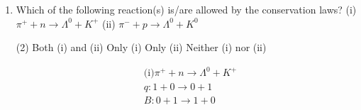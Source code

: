 \begin{enumerate}
	(iii) $p+n \rightarrow \pi^{+}+\pi^0+\pi^0$\\
	(iv) $p+\bar{v}_e \rightarrow n+e^{+}$\\
	Which of the following statements is true?
	{}
	\begin{tasks}(1)
		\task[\textbf{a.}] Process (i) obeys all conservation laws
		\task[\textbf{b.}]Process (ii) conserves baryon number, but violates energy-momentum conservation
		\task[\textbf{c.}] process (iii) is not allowed by strong interaction but is allowed by weak interactions
		\task[\textbf{d.}] Process (iv) conserves baryon number, but violates lepton number conservation
	\end{tasks}
	\begin{answer}
		\begin{align*}
		&\text { (i)}\quad  \bar{n} \rightarrow \bar{p}+e^{+}+\bar{v}_e\\
		&\begin{array}{lllll}
		q & 0 &-1&+1&
		0 \text{ (conserved)}\\
		\text { spin }&-\frac{1}{2}&-\frac{1}{2}&-\frac{1}{2}&-\frac{1}{2} \text { (not conserved) }\\
		\text { Le } &0 &0 &-1 & -1 \text { (not conserved) }
		\end{array}\\
		&\text{(ii) Baryon number is conserved but energy and momentum conservation violated.}\\
		&\text{(iii) spin is not conserved}\\
		&\text{(iv) obeys all conservation laws.}
		\end{align*}
		So the correct answer is \textbf{Option (b)}
	\end{answer}
	\item Which of the following reaction(s) is/are allowed by the conservation laws?
	(i) $\pi^{+}+n \rightarrow \Lambda^0+K^{+}$
	(ii) $\pi^{-}+p \rightarrow \Lambda^0+K^0$
	{}
	\begin{tasks}(2)
		\task[\textbf{a.}]Both (i) and (ii)
		\task[\textbf{b.}] Only (i)
		\task[\textbf{c.}] Only (ii)
		\task[\textbf{d.}]  Neither (i) nor (ii)
	\end{tasks}
	\begin{answer}
		\begin{align*}
		&\text{(i)}\pi^{+}+n \rightarrow \Lambda^0+K^{+}\\
		&q: 1+0 \rightarrow 0+1 \\
		&B: 0+1 \rightarrow 1+0 \\

\end{align*}
\end{answer}
\end{enumerate}

